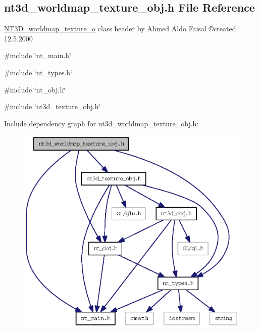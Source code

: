\subsection{nt3d\_\-worldmap\_\-texture\_\-obj.h File Reference}
\label{nt3d__worldmap__texture__obj_8h}



\begin{DoxyItemize}
\item \hyperlink{class_n_t3_d__worldmap__texture__o}{NT3D\_\-worldmap\_\-texture\_\-o} class header by Ahmed Aldo Faisal \copyright created 12.5.2000 
\end{DoxyItemize} 


{\ttfamily \#include \char`\"{}nt\_\-main.h\char`\"{}}\par
{\ttfamily \#include \char`\"{}nt\_\-types.h\char`\"{}}\par
{\ttfamily \#include \char`\"{}nt\_\-obj.h\char`\"{}}\par
{\ttfamily \#include \char`\"{}nt3d\_\-texture\_\-obj.h\char`\"{}}\par
Include dependency graph for nt3d\_\-worldmap\_\-texture\_\-obj.h:
\nopagebreak
\begin{figure}[H]
\begin{center}
\leavevmode
\includegraphics[width=393pt]{nt3d__worldmap__texture__obj_8h__incl}
\end{center}
\end{figure}
